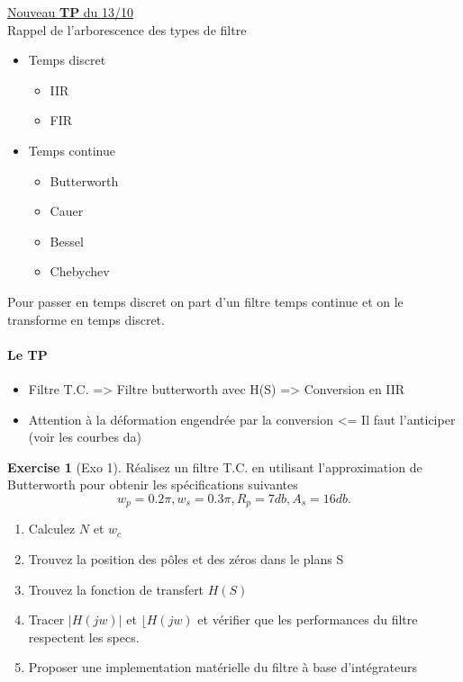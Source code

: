 \documentclass{article}
\theoremstyle{plain}%
\theoremstyle{definition}
\newtheorem{xca}[exmp]{Exercise}
\theoremstyle{remark}
\begin{document}
\underline{Nouveau \textbf{TP} du 13/10} \\
Rappel de l'arborescence des types de filtre
\begin{itemize}
    \item Temps discret \begin{itemize}
        \item IIR
        \item FIR
    \end{itemize}
    \item Temps continue\begin{itemize}
        \item Butterworth
        \item Cauer
        \item Bessel
        \item Chebychev
    \end{itemize}
\end{itemize}
Pour passer en temps discret on part d'un filtre temps continue et on le transforme en temps discret.

\paragraph*{Le TP}
\begin{itemize}
    \item Filtre T.C. => Filtre butterworth avec H(S) => Conversion en IIR
    \item Attention à la déformation engendrée par la conversion <= Il faut l'anticiper (voir les courbes da)
\end{itemize}

\begin{xca}[Exo 1]
    Réalisez un filtre T.C. en utilisant l'approximation de Butterworth pour obtenir les spécifications suivantes 
    \[
        w_p = 0.2 \pi, w_s=0.3 \pi , R_p = 7 db, A_s = 16 db
    .\]
    \begin{enumerate}
        \item Calculez $ N $ et $ w_c $
        \item Trouvez la position des pôles et des zéros dans le plans S
        \item Trouvez la fonction de transfert $ H(S) $
        \item Tracer $ \left| H(jw) \right|  $ et $ \lfloor H(jw) $ et vérifier que les performances du filtre respectent les specs.
        \item Proposer une implementation matérielle du filtre à base d'intégrateurs
    \end{enumerate}
\end{xca}
\end{document}
